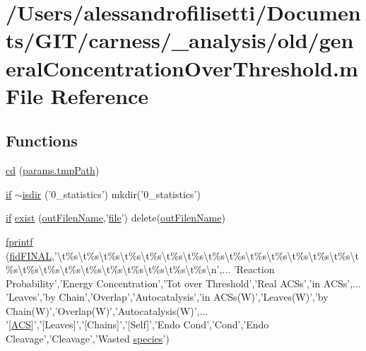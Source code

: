 \hypertarget{a00028}{\section{/\-Users/alessandrofilisetti/\-Documents/\-G\-I\-T/carness/\-\_\-analysis/old/general\-Concentration\-Over\-Threshold.m File Reference}
\label{a00028}
}
\subsection*{Functions}
\begin{DoxyCompactItemize}
\item 
\hyperlink{a00028_afb8c99b8f4d982428090b0b6ab07dafb}{cd} (\hyperlink{a00032_a1e5a4863ab2b87f923e1d19e2da1f5ac}{params.\-tmp\-Path})
\item 
\hyperlink{a00030_a01d55766b8058903dd360b4bda71f9f5}{if} \hyperlink{a00028_a8b0a903208664a3adb1355b79af314b4}{$\sim$isdir} ('0\-\_\-statistics') mkdir('0\-\_\-statistics')
\item 
\hyperlink{a00030_a01d55766b8058903dd360b4bda71f9f5}{if} \hyperlink{a00028_a1e641c44546ec25e735b887393dceb16}{exist} (\hyperlink{a00028_af42e186bcb2ad28b937ef14407da1f0d}{out\-Filen\-Name},'\hyperlink{a00110_a4e8353d6c62cf54bf4a1a8f63e56b8c3}{file}') delete(\hyperlink{a00028_af42e186bcb2ad28b937ef14407da1f0d}{out\-Filen\-Name})
\item 
\hyperlink{a00028_a6ffb0f3cb73c8f8faf0b5192942de203}{fprintf} (\hyperlink{a00028_a2f1bf22f6a0c3f5791577061e92c0433}{fid\-F\-I\-N\-A\-L},'\textbackslash{}t\%s\textbackslash{}t\%s\textbackslash{}t\%s\textbackslash{}t\%s\textbackslash{}t\%s\textbackslash{}t\%s\textbackslash{}t\%s\textbackslash{}t\%s\textbackslash{}t\%s\textbackslash{}t\%s\textbackslash{}t\%s\textbackslash{}t\%s\textbackslash{}t\%s\textbackslash{}t\%s\textbackslash{}t\%s\textbackslash{}t\%s\textbackslash{}t\%s\textbackslash{}t\%s\textbackslash{}t\%s\textbackslash{}t\%s\textbackslash{}t\%s\textbackslash{}t\%s\textbackslash{}t\%s\textbackslash{}t\%s\textbackslash{}n',... 'Reaction Probability','Energy Concentration','Tot over Threshold','Real A\-C\-Ss','in A\-C\-Ss',... 'Leaves','by Chain','Overlap','Autocatalysis','in A\-C\-Ss(W)','Leaves(W)','by Chain(W)','Overlap(W)','Autocatalysis(W)',... '\mbox{[}\hyperlink{a00028_ad72e1068795c577213481e5db7f3e925}{A\-C\-S}\mbox{]}','\mbox{[}Leaves\mbox{]}','\mbox{[}Chains\mbox{]}','\mbox{[}Self\mbox{]}','Endo Cond','Cond','Endo Cleavage','Cleavage','Wasted \hyperlink{a00022}{species}')

\end{DoxyCompactItemize}
